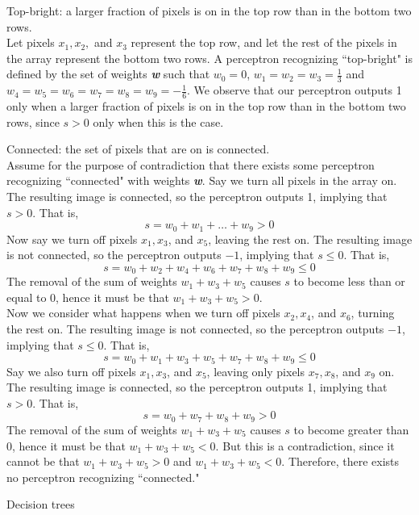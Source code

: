\documentclass[solution, letterpaper]{cs121}
\begin{document}
\subproblem Top-bright: a larger fraction of pixels is on in the top row than in the bottom two rows. \\

Let pixels $x_1, x_2,$ and $x_3$ represent the top row, and let the rest of the pixels in the array represent the bottom two rows. A perceptron recognizing ``top-bright" is defined by the set of weights {\textbf{\emph{w}}} such that $w_0 = 0$, $w_1 = w_2 = w_3 = \frac{1}{3}$ and $w_4 = w_5 = w_6 = w_7 = w_8 = w_9 = -\frac{1}{6}$. We observe that our perceptron outputs 1 only when a larger fraction of pixels is on in the top row than in the bottom two rows, since $s > 0$ only when this is the case.

\subproblem Connected: the set of pixels that are on is connected. \\

Assume for the purpose of contradiction that there exists some perceptron recognizing ``connected" with weights {\textbf{\emph{w}}}. Say we turn all pixels in the array on. The resulting image is connected, so the perceptron outputs 1, implying that $s > 0$. That is, 
\[ s = w_0 + w_1 + \ldots + w_9 > 0 \]
Now say we turn off pixels $x_1, x_3$, and $x_5$, leaving the rest on. The resulting image is not connected, so the perceptron outputs $-1$, implying that $s \leq 0$. That is,
\[ s = w_0 + w_2 + w_4 + w_6  + w_7 + w_8 + w_9 \leq 0 \]
The removal of the sum of weights $w_1 + w_3 + w_5$ causes $s$ to become less than or equal to 0, hence it must be that $w_1 + w_3 + w_5 > 0$. \\

Now we consider what happens when we turn off pixels $x_2, x_4$, and $x_6$, turning the rest on. The resulting image is not connected, so the perceptron outputs $-1$, implying that $s \leq 0$. That is,
\[ s = w_0 + w_1 + w_3 + w_5 + w_7 + w_8 + w_9 \leq 0 \]
Say we also turn off pixels $x_1, x_3$, and $x_5$, leaving only pixels $x_7, x_8$, and $x_9$ on. The resulting image is connected, so the perceptron outputs 1, implying that $s > 0$. That is,
\[ s = w_0 + w_7 + w_8 + w_9 > 0 \]
The removal of the sum of weights $w_1 + w_3 + w_5$ causes $s$ to become greater than 0, hence it must be that $w_1 + w_3 + w_5 < 0$. But this is a contradiction, since it cannot be that $w_1 + w_3 + w_5 > 0$ and $w_1 + w_3 + w_5 < 0$. Therefore, there exists no perceptron recognizing ``connected."


\subproblem Decision trees \\
\end{document}
